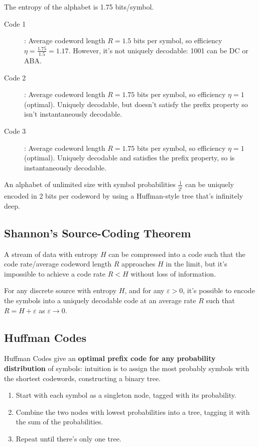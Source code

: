 \documentclass[a4paper, 11pt]{article}
\begin{document}
{{        The entropy of the alphabet is 1.75 bits/symbol. 
        \begin{description}
        \item[Code 1]: Average codeword length \(R = 1.5\) bits per symbol, so efficiency \(\eta = \frac{1.75}{1.5} = 1.17\). However, it's not uniquely decodable: 1001 can be DC or ABA.
        \item[Code 2]: Average codeword length \(R = 1.75\) bits per symbol, so efficiency \(\eta = 1\) (optimal). Uniquely decodable, but doesn't satisfy the prefix property so isn't instantaneously decodable.
        \item[Code 3]: Average codeword length \(R = 1.75\) bits per symbol, so efficiency \(\eta = 1\) (optimal). Uniquely decodable and satisfies the prefix property, so is instantaneously decodable.
        \end{description}

        An alphabet of unlimited size with symbol probabilities \(\frac{1}{2^i}\) can be uniquely encoded in 2 bits per codeword by using a Huffman-style tree that's infinitely deep.
    }
    \subsection*{Shannon's Source-Coding Theorem}
    {
        A stream of data with entropy \(H\) can be compressed into a code such that the code rate/average codeword length \(R\) approaches \(H\) in the limit, but it's impossible to achieve a code rate \(R < H\) without loss of information.

        For any discrete source with entropy \(H\), and for any \(\varepsilon > 0\), it's possible to encode the symbols into a uniquely decodable code at an average rate \(R\) such that \(R = H + \varepsilon\) as \(\varepsilon \rightarrow 0\).
    }
    \subsection*{Huffman Codes}
    {
        Huffman Codes give an \textbf{optimal prefix code for any probability distribution} of symbols: intuition is to assign the most probably symbols with the shortest codewords, constructing a binary tree.

        \begin{enumerate}
        \item Start with each symbol as a singleton node, tagged with its probability.
        \item Combine the two nodes with lowest probabilities into a tree, tagging it with the sum of the probabilities.
        \item Repeat until there's only one tree.
        \end{enumerate}

}}
\end{document}
